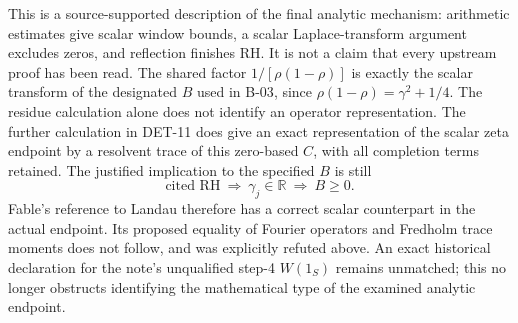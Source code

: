 \documentclass[11pt,a4paper]{article}
\newcommand{\R}{\mathbb R}
\newcommand{\fid}[1]{\textsf{#1}}
\begin{document}
This is a source-supported description of the final analytic mechanism: arithmetic estimates give scalar window bounds, a scalar Laplace-transform argument excludes zeros, and reflection finishes RH. It is not a claim that every upstream proof has been read. The shared factor $1/[\rho(1-\rho)]$ is exactly the scalar transform of the designated $B$ used in \fid{B-03}, since $\rho(1-\rho)=\gamma^2+1/4$. The residue calculation alone does not identify an operator representation. The further calculation in \fid{DET-11} does give an exact representation of the scalar zeta endpoint by a resolvent trace of this zero-based $C$, with all completion terms retained. The justified implication to the specified $B$ is still
\[
 \text{cited RH}\ \Longrightarrow\ \gamma_j\in\R\ \Longrightarrow\ B\ge0.
\]
Fable's reference to Landau therefore has a correct scalar counterpart in the actual endpoint. Its proposed equality of Fourier operators and Fredholm trace moments does not follow, and was explicitly refuted above. An exact historical declaration for the note's unqualified step-4 $W(1_S)$ remains unmatched; this no longer obstructs identifying the mathematical type of the examined analytic endpoint.
\end{document}
